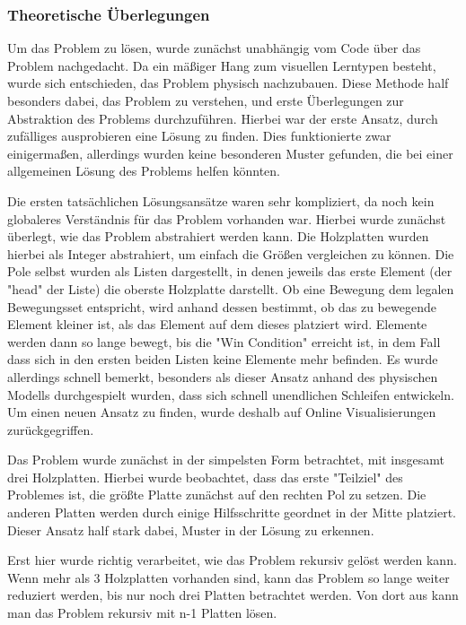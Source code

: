 \subsubsection{Theoretische Überlegungen}
Um das Problem zu lösen, wurde zunächst unabhängig vom Code über das Problem nachgedacht. Da ein mäßiger Hang zum visuellen Lerntypen besteht, wurde sich entschieden, das Problem physisch nachzubauen. Diese Methode half besonders dabei, das Problem zu verstehen, und erste Überlegungen zur Abstraktion des Problems durchzuführen. Hierbei war der erste Ansatz, durch zufälliges ausprobieren eine Lösung zu finden. Dies funktionierte zwar einigermaßen, allerdings wurden keine besonderen Muster gefunden, die bei einer allgemeinen Lösung des Problems helfen könnten.

Die ersten tatsächlichen Lösungsansätze waren sehr kompliziert, da noch kein globaleres Verständnis für das Problem vorhanden war. Hierbei wurde zunächst überlegt, wie das Problem abstrahiert werden kann.
Die Holzplatten wurden hierbei als Integer abstrahiert, um einfach die Größen vergleichen zu können. Die Pole selbst wurden als Listen dargestellt, in denen jeweils das erste Element (der "head" der Liste) die oberste Holzplatte darstellt.
Ob eine Bewegung dem legalen Bewegungsset entspricht, wird anhand dessen bestimmt, ob das zu bewegende Element kleiner ist, als das Element auf dem dieses platziert wird. Elemente werden dann so lange bewegt, bis die "Win Condition" erreicht ist, in dem Fall dass sich in den ersten beiden Listen keine Elemente mehr befinden.
Es wurde allerdings schnell bemerkt, besonders als dieser Ansatz anhand des physischen Modells durchgespielt wurden, dass sich schnell unendlichen Schleifen entwickeln. Um einen neuen Ansatz zu finden, wurde deshalb auf Online Visualisierungen zurückgegriffen.

Das Problem wurde zunächst in der simpelsten Form betrachtet, mit insgesamt drei Holzplatten. Hierbei wurde beobachtet, dass das erste "Teilziel" des Problemes ist, die größte Platte zunächst auf den rechten Pol zu setzen. Die anderen Platten werden durch einige Hilfsschritte geordnet in der Mitte platziert. Dieser Ansatz half stark dabei, Muster in der Lösung zu erkennen.

Erst hier wurde richtig verarbeitet, wie das Problem rekursiv gelöst werden kann. Wenn mehr als 3 Holzplatten vorhanden sind, kann das Problem so lange weiter reduziert werden, bis nur noch drei Platten betrachtet werden. Von dort aus kann man das Problem rekursiv mit n-1 Platten lösen.


